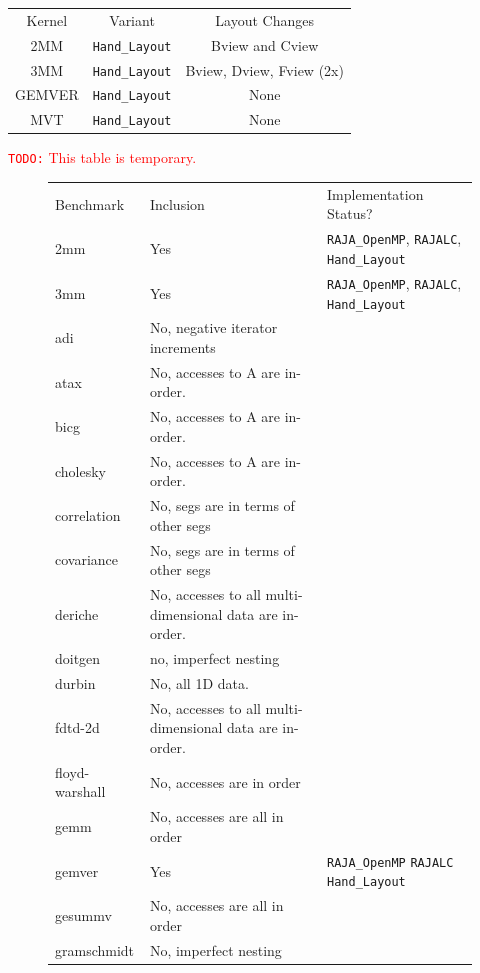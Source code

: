 \documentclass[sigconf, table]{acmart}
\newcommand{\todo}[1]{{\textcolor{red}{{\tt{TODO:}}\,\,#1 }}}
\begin{document}
\begin{table}
	\centering
	\begin{tabular}{c|c|c}
		Kernel & Variant & Layout Changes \\
		2MM & \verb.Hand_Layout. & Bview and Cview \\
		3MM & \verb.Hand_Layout. & Bview, Dview, Fview (2x) \\
		GEMVER & \verb.Hand_Layout. & None \\
		MVT & \verb.Hand_Layout. & None 
	\end{tabular}
\end{table}



\todo{This table is temporary.}
\begin{figure}
\begin{tabular}{lll}
Benchmark   & Inclusion  & Implementation Status?\\
2mm         & Yes        &  \verb.RAJA_OpenMP., \verb.RAJALC., \verb.Hand_Layout.\\
3mm         & Yes        &  \verb.RAJA_OpenMP., \verb.RAJALC., \verb.Hand_Layout.\\
adi         & No, negative iterator increments       \\
atax        & No, accesses to A are in-order.          \\
bicg        & No, accesses to A are in-order.          \\
cholesky    & No, accesses to A are in-order.          \\
correlation & No, segs are in terms of other segs         \\
covariance  & No, segs are in terms of other segs          \\
deriche     & No, accesses to all multi-dimensional data are in-order.          \\
doitgen     & no, imperfect nesting        \\
durbin      & No, all 1D data.          \\
fdtd-2d     & No, accesses to all multi-dimensional data are in-order.           \\
floyd-warshall & No, accesses are in order \\
gemm        &  No, accesses are all in order         \\
gemver      & Yes        & \verb.RAJA_OpenMP. \verb.RAJALC. \verb.Hand_Layout. \\
gesummv     & No, accesses are all in order          \\
gramschmidt & No, imperfect nesting          \\

\end{tabular}
\end{figure}
\end{document}
